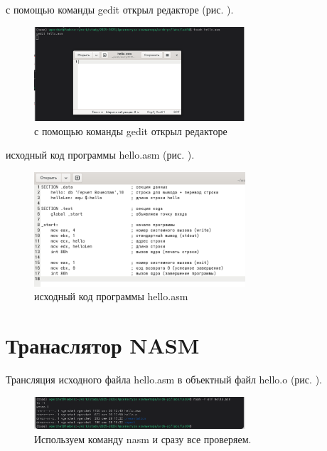 \documentclass[
  12pt,
  a4paper,
  DIV=11,
  numbers=noendperiod]{scrreprt}
\begin{document}
с помощью команды gedit открыл редакторе (рис. \textcite{fig:002}).

\begin{figure}

{\centering \includegraphics[width=0.7\textwidth,height=\textheight]{image/2.png}

}

\caption{с помощью команды gedit открыл редакторе}

\end{figure}%

исходный код программы hello.asm (рис. \textcite{fig:003}).

\begin{figure}

{\centering \includegraphics[width=0.7\textwidth,height=\textheight]{image/3.png}

}

\caption{исходный код программы hello.asm}

\end{figure}%

\section{Транаслятор
NASM}\label{ux442ux440ux430ux43dux430ux441ux43bux44fux442ux43eux440-nasm}

Трансляция исходного файла hello.asm в объектный файл hello.o (рис.
\textcite{fig:004}).

\begin{figure}

{\centering \includegraphics[width=0.7\textwidth,height=\textheight]{image/4.png}

}

\caption{Используем команду nasm и сразу все проверяем.}

\end{figure}%
\end{document}
